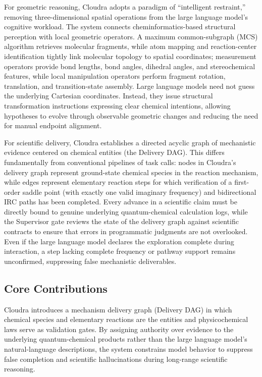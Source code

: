 For geometric reasoning, Cloudra adopts a paradigm of “intelligent restraint,” removing three-dimensional spatial operations from the large language model's cognitive workload. The system connects cheminformatics-based structural perception with local geometric operators. A maximum common-subgraph (MCS) algorithm retrieves molecular fragments, while atom mapping and reaction-center identification tightly link molecular topology to spatial coordinates; measurement operators provide bond lengths, bond angles, dihedral angles, and stereochemical features, while local manipulation operators perform fragment rotation, translation, and transition-state assembly. Large language models need not guess the underlying Cartesian coordinates. Instead, they issue structural transformation instructions expressing clear chemical intentions, allowing hypotheses to evolve through observable geometric changes and reducing the need for manual endpoint alignment.



For scientific delivery, Cloudra establishes a directed acyclic graph of mechanistic evidence centered on chemical entities (the Delivery DAG). This differs fundamentally from conventional pipelines of task calls: nodes in Cloudra's delivery graph represent ground-state chemical species in the reaction mechanism, while edges represent elementary reaction steps for which verification of a first-order saddle point (with exactly one valid imaginary frequency) and bidirectional IRC paths has been completed. Every advance in a scientific claim must be directly bound to genuine underlying quantum-chemical calculation logs, while the Supervisor gate reviews the state of the delivery graph against scientific contracts to ensure that errors in programmatic judgments are not overlooked. Even if the large language model declares the exploration complete during interaction, a step lacking complete frequency or pathway support remains unconfirmed, suppressing false mechanistic deliverables.



\subsection{Core Contributions}

Cloudra introduces a mechanism delivery graph (Delivery DAG) in which chemical species and elementary reactions are the entities and physicochemical laws serve as validation gates. By assigning authority over evidence to the underlying quantum-chemical products rather than the large language model's natural-language descriptions, the system constrains model behavior to suppress false completion and scientific hallucinations during long-range scientific reasoning.

